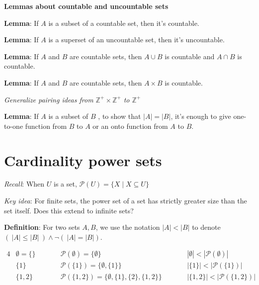 \documentclass[12pt, oneside]{article}
\begin{document}
{\bf Lemmas about countable and uncountable sets}

{\bf Lemma}: If $A$ is a subset of a countable set, then it's countable.

\vspace{80pt}

{\bf Lemma}: If $A$ is a superset of an uncountable set, then it's uncountable.

\vspace{80pt}

{\bf Lemma}: If $A$ and $B$ are countable sets, then $A \cup B$ is countable
and $A \cap B$ is countable.

\vspace{80pt}

{\bf Lemma}: If $A$ and $B$ are countable sets, then $A \times B$ is countable.

{\it Generalize pairing ideas from $\mathbb{Z}^+ \times \mathbb{Z}^+$ to $\mathbb{Z}^+$}

\vspace{50pt}

{\bf Lemma}: If $A$ is a subset of $B$ , to show that $|A| = |B|$, 
it's enough to give one-to-one function from $B$ to $A$ or an onto function 
from $A$ to $B$.

\vspace{80pt}
 \vfill
\section*{Cardinality power sets}


{\it Recall}: When $U$ is a set, $\mathcal{P}(U) = \{ X \mid X \subseteq U\}$

{\it Key idea}: For finite sets, the power set of a set has strictly greater size than the set itself.
Does this extend to infinite sets?

{\bf Definition}: For two sets $A, B$, we use the notation $|A| < |B|$ to denote
$(~|A| \leq |B| ~) \land \lnot (~|A| = |B|)$.

\begin{alignat*}{4}
    &\emptyset = \{ \} \qquad &&\mathcal{P}(\emptyset) = \{ \emptyset \} \qquad &&|\emptyset| < |\mathcal{P}(\emptyset)| \\
    &\{1 \} \qquad &&\mathcal{P}(\{1\}) = \{ \emptyset, \{1\} \} \qquad &&|\{1\}| < |\mathcal{P}(\{1\})| \\
    &\{1,2 \} \qquad &&\mathcal{P}(\{1,2\}) = \{ \emptyset, \{1\}, \{2\}, \{1,2\} \} \qquad &&|\{1,2\}| < |\mathcal{P}(\{1,2\})| \\
\end{alignat*}
\end{document}
